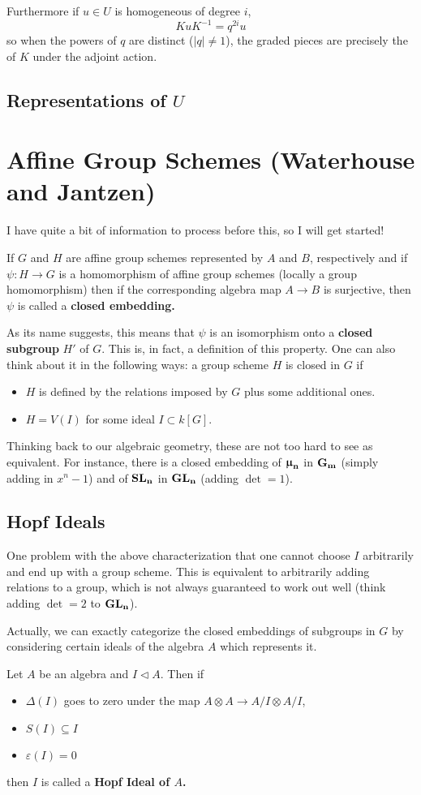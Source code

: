 \documentclass[12pt]{article}
\theoremstyle{nonumberbreak}
\theoremstyle{changebreak}
\theoremstyle{nonumberplain}
\theoremstyle{change}
\newcommand{\Gm}{\ensuremath\mathbf{G_m}}
\newcommand*{\GL}[1]{\ensuremath\mathbf{GL_#1}}
\newcommand*{\SL}[1]{\ensuremath\mathbf{SL_#1}}
\newcommand*{\mun}[1]{\ensuremath\mathbf{\bm\upmu_#1}}
\begin{document}
Furthermore if $u\in U$ is homogeneous of degree $i$, 
\[KuK^{-1}=q^{2i}u\]
so when the powers of $q$ are distinct ($|q|\ne 1$), the graded pieces are precisely the 
 of $K$ under the adjoint action.

\subsection{Representations of $U$}

\newpage
\section{Affine Group Schemes (Waterhouse and Jantzen)}
I have quite a bit of information to process before this, so I will get started!
\begin{defn}
	If $G$ and $H$ are affine group schemes represented by $A$ and $B$, respectively and
	if $\psi:H\to G$ is a homomorphism of affine group schemes (locally a group homomorphism)
	then if the corresponding algebra map $A\to B$ is surjective, then $\psi$ is called
	a \textbf{closed embedding.}
\end{defn}

As its name suggests, this means that $\psi$ is an isomorphism onto a \textbf{closed subgroup}
$H'$ of $G$. This is, in fact, a definition of this property. One can also think about 
it in the following ways: a group scheme $H$ is closed in $G$ if
\begin{itemize}
	\item $H$ is defined by the relations imposed by $G$ plus some additional ones.
	\item $H=V(I)$ for some ideal $I\subset k[G]$. 
\end{itemize}
Thinking back to our algebraic geometry, these are not too hard to see as equivalent. 
For instance, there is a closed embedding of $\mun n$ in $\Gm$ (simply adding in $x^n-1$)
and of $\SL{n}$ in $\GL{n}$ (adding $\det = 1$).

\subsection{Hopf Ideals}
One problem with the above characterization that one cannot choose $I$ arbitrarily and end
up with a group scheme. This is equivalent to arbitrarily adding relations to a group, which is
not always guaranteed to work out well (think adding $\det = 2$ to $\GL n$).

Actually, we can exactly categorize the closed embeddings of subgroups in $G$ by considering certain
ideals of the algebra $A$ which represents it. 
\begin{defn}
	Let $A$ be an algebra and $I\lhd A$. Then if 
	\begin{itemize}
		\item $\Delta(I)$ goes to zero under the map $A\otimes A\to A/I\otimes A/I$,
		\item $S(I)\subseteq I$
		\item $\varepsilon(I)=0$
	\end{itemize}
	then $I$ is called a \textbf{Hopf Ideal of $A$.}
\end{defn}
\end{document}
